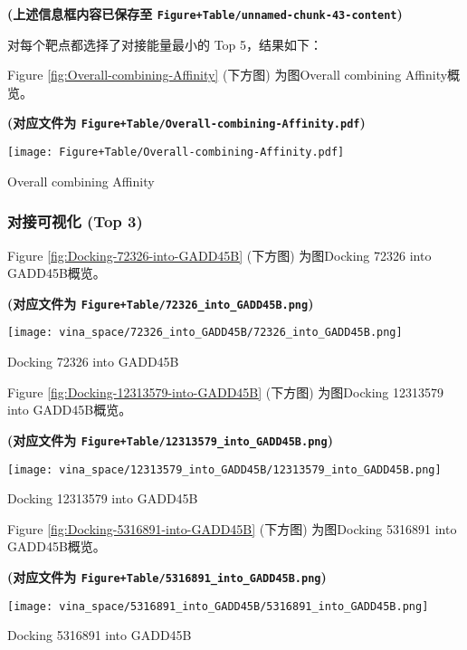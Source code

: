 \documentclass[
]{article}
\begin{document}
\textbf{(上述信息框内容已保存至 \texttt{Figure+Table/unnamed-chunk-43-content})}

对每个靶点都选择了对接能量最小的 Top 5，结果如下：

Figure \ref{fig:Overall-combining-Affinity} (下方图) 为图Overall combining Affinity概览。

\textbf{(对应文件为 \texttt{Figure+Table/Overall-combining-Affinity.pdf})}

\def\@captype{figure}
\begin{center}
\texttt{[image: Figure+Table/Overall-combining-Affinity.pdf]}
\caption{Overall combining Affinity}\label{fig:Overall-combining-Affinity}
\end{center}

\hypertarget{ux5bf9ux63a5ux53efux89c6ux5316-top-3}{%
\subsubsection{对接可视化 (Top 3)}\label{ux5bf9ux63a5ux53efux89c6ux5316-top-3}}

Figure \ref{fig:Docking-72326-into-GADD45B} (下方图) 为图Docking 72326 into GADD45B概览。

\textbf{(对应文件为 \texttt{Figure+Table/72326\_into\_GADD45B.png})}

\def\@captype{figure}
\begin{center}
\texttt{[image: vina\_space/72326\_into\_GADD45B/72326\_into\_GADD45B.png]}
\caption{Docking 72326 into GADD45B}\label{fig:Docking-72326-into-GADD45B}
\end{center}

Figure \ref{fig:Docking-12313579-into-GADD45B} (下方图) 为图Docking 12313579 into GADD45B概览。

\textbf{(对应文件为 \texttt{Figure+Table/12313579\_into\_GADD45B.png})}

\def\@captype{figure}
\begin{center}
\texttt{[image: vina\_space/12313579\_into\_GADD45B/12313579\_into\_GADD45B.png]}
\caption{Docking 12313579 into GADD45B}\label{fig:Docking-12313579-into-GADD45B}
\end{center}

Figure \ref{fig:Docking-5316891-into-GADD45B} (下方图) 为图Docking 5316891 into GADD45B概览。

\textbf{(对应文件为 \texttt{Figure+Table/5316891\_into\_GADD45B.png})}

\def\@captype{figure}
\begin{center}
\texttt{[image: vina\_space/5316891\_into\_GADD45B/5316891\_into\_GADD45B.png]}
\caption{Docking 5316891 into GADD45B}\label{fig:Docking-5316891-into-GADD45B}
\end{center}
\end{document}

